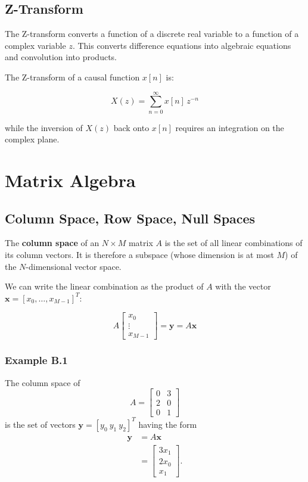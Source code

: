 \subsection{Z-Transform}

The Z-transform converts a function of a discrete real variable to a function of a complex variable $z$.  
This converts difference equations into algebraic equations and convolution into products.

The Z-transform of a causal function $x[n]$ is:

\begin{equation}
X(z) = \sum_{n=0}^{\infty} x[n]\,z^{-n} \tag{A.13}
\end{equation}

while the inversion of $X(z)$ back onto $x[n]$ requires an integration on the complex plane.

\section{Matrix Algebra}

\subsection{Column Space, Row Space, Null Spaces}

The \textbf{column space} of an $N \times M$ matrix $A$ is the set of all linear combinations of its column vectors.  
It is therefore a subspace (whose dimension is at most $M$) of the $N$-dimensional vector space.

We can write the linear combination as the product of $A$ with the vector 
$\mathbf{x} = [x_0, \ldots, x_{M-1}]^T$:

\begin{equation}
A
\begin{bmatrix}
x_0 \\
\vdots \\
x_{M-1}
\end{bmatrix}
= \mathbf{y} = A\mathbf{x}
\tag{B.1}
\end{equation}

\subsubsection{Example B.1}

The column space of
\begin{equation}
A =
\begin{bmatrix}
0 & 3 \\
2 & 0 \\
0 & 1
\end{bmatrix}
\tag{B.2}
\end{equation}
is the set of vectors $\mathbf{y} = [y_0\ y_1\ y_2]^T$ having the form
\begin{align}
\mathbf{y} &= A\mathbf{x} \tag{B.3} \\
&=
\begin{bmatrix}
3x_1 \\
2x_0 \\
x_1
\end{bmatrix}.
\tag{B.4}
\end{align}

